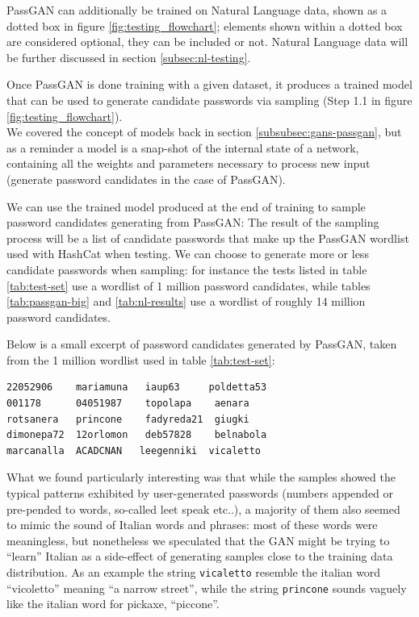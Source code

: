 PassGAN can additionally be trained on Natural Language data, shown as a dotted box in figure \ref{fig:testing_flowchart}; elements shown within a dotted box are considered optional, they can be included or not. Natural Language data will be further discussed in section \ref{subsec:nl-testing}.

Once PassGAN is done training with a given dataset, it produces a trained model that can be used to generate candidate passwords via sampling (Step 1.1 in figure \ref{fig:testing_flowchart}).\\ 
We covered the concept of models back in section \ref{subsubsec:gans-passgan}, but as a reminder a model is a snap-shot of the internal state of a network, containing all the weights and parameters necessary to process new input (generate password candidates in the case of PassGAN).

We can use the trained model produced at the end of training to sample password candidates generating from PassGAN: The result of the sampling process will be a list of candidate passwords that make up the PassGAN wordlist used with HashCat when testing. We can choose to generate more or less candidate passwords when sampling: for instance the tests listed in table \ref{tab:test-set} use a wordlist of 1 million password candidates, while tables \ref{tab:passgan-big} and \ref{tab:nl-results} use a wordlist of roughly 14 million password candidates.

Below is a small excerpt of password candidates generated by PassGAN, taken from the 1 million wordlist used in table \ref{tab:test-set}: 
\begin{verbatim}
22052906    mariamuna   iaup63     poldetta53
001178      04051987    topolapa    aenara
rotsanera   princone    fadyreda21  giugki
dimonepa72  12orlomon   deb57828    belnabola
marcanalla  ACADCNAN   leegenniki  vicaletto
\end{verbatim}

What we found particularly interesting was that while the samples showed the typical patterns exhibited by user-generated passwords (numbers appended or pre-pended to words, so-called leet speak etc..), a majority of them also seemed to mimic the sound of Italian words and phrases: most of these words were meaningless, but nonetheless we speculated that the GAN might be trying to \enquote{learn} Italian as a side-effect of generating samples close to the training data distribution.
As an example the string \texttt{vicaletto} resemble the italian word \enquote{vicoletto} meaning \enquote{a narrow street}, while the string \texttt{princone} sounds vaguely like the italian word for pickaxe, \enquote{piccone}. 

